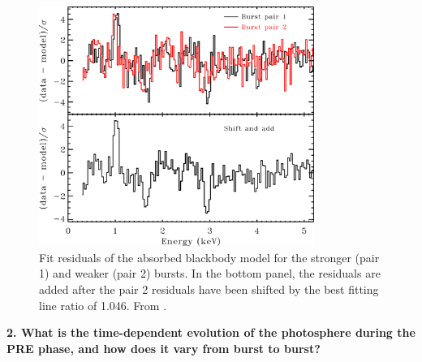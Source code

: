 \documentclass[../main.tex]{subfiles}
\begin{document}

\begin{figure}[htb!]
    \centering
    \includegraphics[width=0.8\textwidth]{figures/Strohmayer2019_residuals.jpg}
    \caption[Burst spectra fit residuals showing spectral lines]{Fit residuals of the absorbed blackbody model for the stronger (pair 1) and weaker (pair 2) bursts. In the bottom panel, the residuals are added after the pair 2 residuals have been shifted by the best fitting line ratio of 1.046. From \citet{Strohmayer2019}.}
    \label{fig:strohmayer_burstpair_residuals}
\end{figure}

\noindent\textbf{2. What is the time-dependent evolution of the photosphere during the PRE phase, and how does it vary from burst to burst?} 
\end{document}
